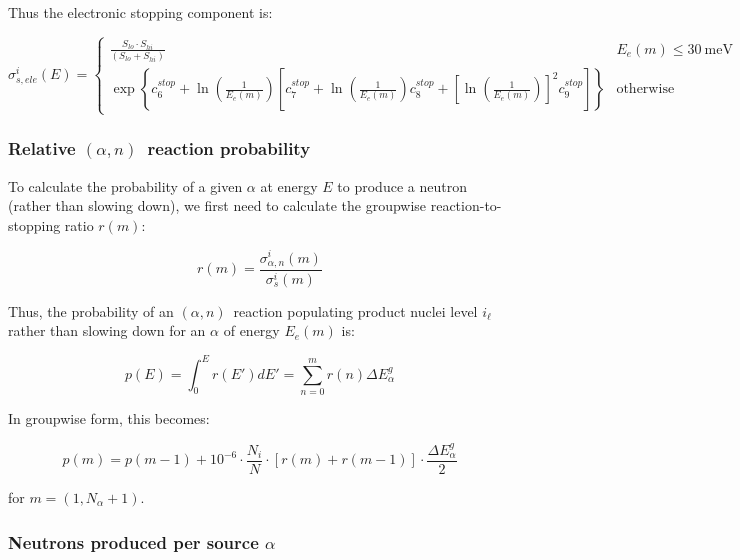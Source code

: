 \documentclass[10pt]{article}
\newcommand{\alphn}[0]{$\left(\alpha,n\right)$}
\begin{document}
Thus the electronic stopping component is:

\begin{equation}
\sigma_{s,ele}^i \left(E\right) =
\begin{cases}
\displaystyle \frac{S_{lo} \cdot S_{hi} }{\left(S_{lo} + S_{hi} \right)} & E_e\left(m\right) \leq 30\ \mathrm{meV} \\[12pt]
\displaystyle \exp\left\{ {c_6^{stop}} + \ln\left(\frac{1}{E_e\left(m\right)} \right) \left[ c_7^{stop} + \ln\left(\frac{1}{E_e\left(m\right)} \right) c_8^{stop} + \left[\ln\left(\frac{1}{E_e\left(m\right)}\right)\right]^2 c_9^{stop} \right] \right\} & \mathrm{otherwise}
\end{cases}
\end{equation}

\subsubsection{Relative \alphn\ reaction probability}

To calculate the probability of a given $\alpha$ at energy $E$ to produce a neutron (rather than slowing down), we first need to calculate the groupwise reaction-to-stopping ratio $r\left(m\right)$:

\begin{equation}
r\left(m\right) = \frac{ \sigma_{\alpha,n}^i \left(m\right) }{ \sigma_s^i \left(m\right) }
\end{equation}

Thus, the probability of an \alphn\ reaction populating product nuclei level $i_\ell$ rather than slowing down for an $\alpha$ of energy $E_e\left(m\right)$ is:

\begin{equation}
p\left(E\right) = \int_0^E r\left(E'\right) dE' = \sum_{n=0}^{m} r\left(n\right) \Delta E_\alpha^g
\label{eq:an_prob_int}
\end{equation}
 
In groupwise form, this becomes:

\begin{equation}
p\left(m\right) = p\left(m-1\right) + 10^{-6} \cdot \frac{N_i}{N} \cdot \left[ r\left(m \right) + r\left(m - 1 \right)  \right]\cdot \frac{\Delta E_\alpha^g}{2} 
\label{eq:an_prob_groupwise}
\end{equation}

for $m=\left(1,N_\alpha + 1\right)$.

\subsubsection{Neutrons produced per source $\alpha$}
\end{document}
